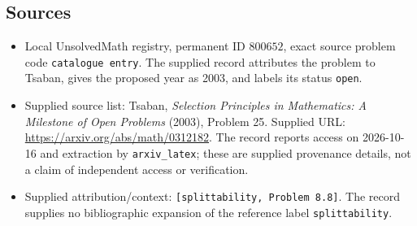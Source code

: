 \documentclass[11pt]{article}
\begin{document}
\subsection{Sources}
\begin{itemize}
\item Local UnsolvedMath registry, permanent ID \(800652\), exact source problem code \texttt{catalogue entry}. The supplied record attributes the problem to Tsaban, gives the proposed year as 2003, and labels its status \texttt{open}.
\item Supplied source list: Tsaban, \emph{Selection Principles in Mathematics: A Milestone of Open Problems} (2003), Problem 25. Supplied URL: \url{https://arxiv.org/abs/math/0312182}. The record reports access on 2026-10-16 and extraction by \texttt{arxiv\_latex}; these are supplied provenance details, not a claim of independent access or verification.
\item Supplied attribution/context: \texttt{[splittability, Problem 8.8]}. The record supplies no bibliographic expansion of the reference label \texttt{splittability}.
\end{itemize}
\end{document}
